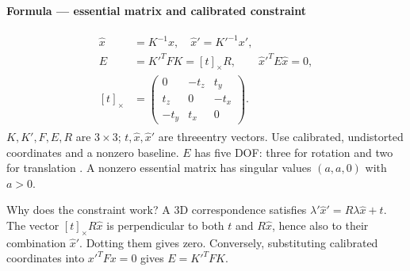 \documentclass[letterpaper,11pt,english,openany,oneside]{jupyterBook}
\begin{document}
\begin{TextbookBox}
\textbf{Formula — essential matrix and calibrated constraint}\par\smallskip
\begin{equation}\label{equation:lectures/lecture04/essential:eq-lec04-essential}
\begin{split}\begin{aligned}
\widehat x&=K^{-1}x,\quad \widehat x'=K'^{-1}x',\\
E&=K'^TFK=[t]_\times R,\qquad \widehat x'^TE\widehat x=0,\\
[t]_\times&=\begin{pmatrix}0&-t_z&t_y\\t_z&0&-t_x\\-t_y&t_x&0\end{pmatrix}.
\end{aligned}\end{split}
\end{equation}
\sphinxAtStartPar
\(K,K',F,E,R\) are \(3\times3\); \(t,\widehat x,\widehat x'\) are three\sphinxhyphen{}entry vectors. Use calibrated, undistorted coordinates and a nonzero baseline. \(E\) has five DOF: three for rotation and two for translation . A nonzero essential matrix has singular values \((a,a,0)\) with \(a>0\).

\end{TextbookBox}

\sphinxAtStartPar
Why does the constraint work? A 3D correspondence satisfies \(\lambda'\widehat x'=R\lambda\widehat x+t\). The vector \([t]_\times R\widehat x\) is perpendicular to both \(t\) and \(R\widehat x\), hence also to their combination \(\widehat x'\). Dotting them gives zero. Conversely, substituting calibrated coordinates into \(x'^TFx=0\) gives \(E=K'^TFK\).
\end{document}
